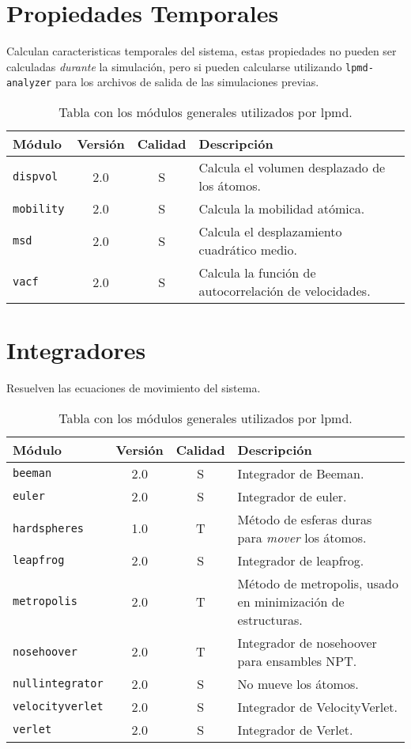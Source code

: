 \section{Propiedades Temporales}
Calculan caracteristicas temporales del sistema, estas propiedades no pueden ser calculadas \textit{durante} la simulaci\'on, pero si pueden calcularse utilizando \verb|lpmd-analyzer| para los archivos de salida de las simulaciones previas.

\begin{table}[h!]
 \begin{tabular}{|l|c|c|p{10cm}|}\hline
 M\'odulo & Versi\'on & Calidad & Descripci\'on \\
 \hline
 \texttt{dispvol} & 2.0 & S & Calcula el volumen desplazado de los \'atomos.\\
 \hline
 \texttt{mobility} & 2.0 & S & Calcula la mobilidad at\'omica.\\
 \hline
 \texttt{msd} & 2.0 & S & Calcula el desplazamiento cuadr\'atico medio.\\
 \hline
 \texttt{vacf} & 2.0 & S & Calcula la funci\'on de autocorrelaci\'on de velocidades.\\
 \hline
 \end{tabular}
\label{tab:modproper}
\caption{Tabla con los m\'odulos generales utilizados por lpmd.}
\end{table}

\section{Integradores}
Resuelven las ecuaciones de movimiento del sistema.

\begin{table}[h!]
 \begin{tabular}{|l|c|c|p{10cm}|}\hline
 M\'odulo & Versi\'on & Calidad & Descripci\'on \\
 \hline\hline
 \texttt{beeman} & 2.0 & S & Integrador de Beeman.\\
 \hline
 \texttt{euler} & 2.0 & S & Integrador de euler.\\
 \hline
 \texttt{hardspheres} & 1.0 & T & M\'etodo de esferas duras para \textit{mover} los \'atomos.\\
 \hline
 \texttt{leapfrog} & 2.0 & S & Integrador de leapfrog.\\
 \hline
 \texttt{metropolis} & 2.0 & T & M\'etodo de metropolis, usado en minimizaci\'on de estructuras.\\
 \hline
 \texttt{nosehoover} & 2.0 & T & Integrador de nosehoover para ensambles NPT.\\
 \hline
 \texttt{nullintegrator} & 2.0 & S & No mueve los \'atomos.\\
 \hline
 \texttt{velocityverlet} & 2.0 & S & Integrador de VelocityVerlet.\\
 \hline
 \texttt{verlet} & 2.0 & S & Integrador de Verlet.\\
 \hline
 \end{tabular}
\label{tab:modginteg}
\caption{Tabla con los m\'odulos generales utilizados por lpmd.}
\end{table}

